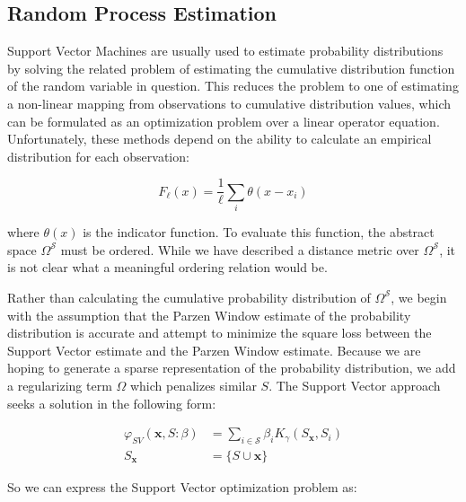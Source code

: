 \documentclass[10pt]{article}
\begin{document}
\subsection{ Random Process Estimation }
Support Vector Machines are usually used to estimate probability distributions by solving the related problem of estimating the cumulative distribution function of the random variable in question.  This reduces the problem to one of estimating a non-linear mapping from observations to cumulative distribution values, which can be formulated as an optimization problem over a linear operator equation.  Unfortunately, these methods depend on the ability to calculate an empirical distribution for each observation:

\begin{equation} F_\ell(x) = \frac{1}{\ell} \sum_i \theta(x-x_i) \end{equation}

where \( \theta(x) \) is the indicator function.  To evaluate this function, the abstract space \( \Omega^\mathcal{S} \) must be ordered.  While we have described a distance metric over \( \Omega^\mathcal{S} \), it is not clear what a meaningful ordering relation would be.

Rather than calculating the cumulative probability distribution of \( \Omega^\mathcal{S} \), we begin with the assumption that the Parzen Window estimate of the probability distribution is accurate and attempt to minimize the square loss between the Support Vector estimate and the Parzen Window estimate.  Because we are hoping to generate a sparse representation of the probability distribution, we add a regularizing term \( \Omega \) which penalizes similar \( S \).  The Support Vector approach seeks a solution in the following form:

\begin{align} \label{eq:SVResultSingle}
\varphi_{SV}( \mathbf{x}, S : \beta) &= \sum_{i \in \mathcal{S}} \beta_i K_\gamma( S_\mathbf{x}, S_i ) \\
S_\mathbf{x} &= \{ S \cup \mathbf{x} \} \nonumber
\end{align}

So we can express the Support Vector optimization problem as:
\end{document}
